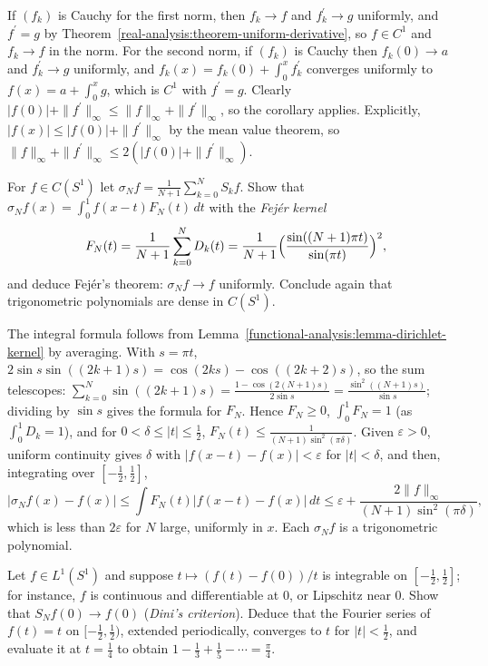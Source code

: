 \begin{solution}
If $(f_k)$ is Cauchy for the first norm, then $f_k \to f$ and $f_k^{\prime} \to g$ uniformly, and $f^{\prime} = g$ by Theorem~\ref{real-analysis:theorem-uniform-derivative}, so $f \in C^1$ and $f_k \to f$ in the norm. For the second
norm, if $(f_k)$ is Cauchy then $f_k(0) \to a$ and $f_k^{\prime} \to g$ uniformly, and $f_k(x) = f_k(0) + \int_0^xf_k^{\prime}$ converges uniformly to $f(x) = a + \int_0^xg$, which is $C^1$ with $f^{\prime} = g$. Clearly
$|f(0)| + \|f^{\prime}\|_\infty \leq \|f\|_\infty + \|f^{\prime}\|_\infty$, so the corollary applies. Explicitly, $|f(x)| \leq |f(0)| + \|f^{\prime}\|_\infty$ by the mean value theorem, so
$\|f\|_\infty + \|f^{\prime}\|_\infty \leq 2(|f(0)| + \|f^{\prime}\|_\infty)$.
\end{solution}

\begin{exercise}\label{functional-analysis:exercise-fejer}
For $f \in C(S^1)$ let $\sigma_Nf = \frac{1}{N + 1}\sum_{k=0}^NS_kf$. Show that $\sigma_Nf(x) = \int_0^1f(x - t)F_N(t)\,dt$ with the \emph{Fej\'er kernel}
\[
F_N(t) = \frac{1}{N + 1}\sum_{k=0}^ND_k(t) = \frac{1}{N + 1}\Bigl(\frac{\sin((N + 1)\pi t)}{\sin(\pi t)}\Bigr)^2,
\]
and deduce Fej\'er's theorem: $\sigma_Nf \to f$ uniformly. Conclude again that trigonometric polynomials are dense in $C(S^1)$.
\end{exercise}

\begin{solution}
The integral formula follows from Lemma~\ref{functional-analysis:lemma-dirichlet-kernel} by averaging. With $s = \pi t$, $2\sin s\sin((2k + 1)s) = \cos(2ks) - \cos((2k + 2)s)$, so the sum telescopes:
$\sum_{k=0}^N\sin((2k + 1)s) = \frac{1 - \cos(2(N + 1)s)}{2\sin s} = \frac{\sin^2((N + 1)s)}{\sin s}$; dividing by $\sin s$ gives the formula for $F_N$. Hence $F_N \geq 0$, $\int_0^1F_N = 1$ (as
$\int_0^1D_k = 1$), and for $0 < \delta \leq |t| \leq \frac12$, $F_N(t) \leq \frac{1}{(N + 1)\sin^2(\pi\delta)}$. Given $\varepsilon > 0$, uniform continuity gives $\delta$ with $|f(x - t) - f(x)| < \varepsilon$ for
$|t| < \delta$, and then, integrating over $[-\frac12, \frac12]$,
\[
|\sigma_Nf(x) - f(x)| \leq \int F_N(t)|f(x - t) - f(x)|\,dt \leq \varepsilon + \frac{2\|f\|_\infty}{(N + 1)\sin^2(\pi\delta)},
\]
which is less than $2\varepsilon$ for $N$ large, uniformly in $x$. Each $\sigma_Nf$ is a trigonometric polynomial.
\end{solution}

\begin{exercise}\label{functional-analysis:exercise-dini}
Let $f \in L^1(S^1)$ and suppose $t \mapsto (f(t) - f(0))/t$ is integrable on $[-\frac12, \frac12]$; for instance, $f$ is continuous and differentiable at $0$, or Lipschitz near $0$. Show that $S_Nf(0) \to f(0)$
(\emph{Dini's criterion}). Deduce that the Fourier series of $f(t) = t$ on $[-\frac12, \frac12)$, extended periodically, converges to $t$ for $|t| < \frac12$, and evaluate it at $t = \frac14$ to obtain
$1 - \frac13 + \frac15 - \cdots = \frac\pi4$.
\end{exercise}

